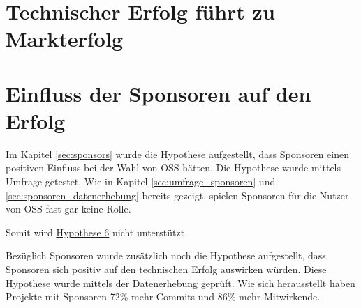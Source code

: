 \section{Technischer Erfolg führt zu Markterfolg}








\section{Einfluss der Sponsoren auf den Erfolg}

Im Kapitel \ref{sec:sponsors} wurde die Hypothese aufgestellt, dass Sponsoren einen positiven Einfluss
bei der Wahl von OSS hätten.
Die Hypothese wurde mittels Umfrage getestet.
Wie in Kapitel \ref{sec:umfrage_sponsoren} und \ref{sec:sponsoren_datenerhebung} bereits gezeigt, 
spielen Sponsoren für die Nutzer von OSS fast gar keine Rolle.

Somit wird \hyperref[H:6]{Hypothese 6} nicht unterstützt.




Bezüglich Sponsoren wurde zusätzlich noch die Hypothese aufgestellt, dass Sponsoren sich positiv auf
den technischen Erfolg auswirken würden. 
Diese Hypothese wurde mittels der Datenerhebung geprüft.
Wie sich herausstellt haben Projekte mit Sponsoren 72\% mehr Commits und 86\% mehr Mitwirkende.

